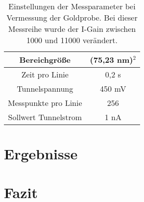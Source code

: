 \documentclass[12pt,a4paper]{article}
\begin{document}
\begin{table}
\centering
\begin{tabular}{|c|c|}
\hline 
Bereichgröße & (75,23 nm)$^2$ \\ 
\hline 
Zeit pro Linie & 0,2 s \\
\hline 
Tunnelspannung & 450 mV \\ 
\hline 
Messpunkte pro Linie & 256 \\
\hline 
Sollwert Tunnelstrom & 1 nA \\
\hline 
\end{tabular} 
\caption{Einstellungen der Messparameter bei Vermessung der Goldprobe. Bei dieser Messreihe wurde der I-Gain zwischen 1000 und 11000 verändert.}
\label{tab:IGain_Einstellungen}
\end{table}


\section{Ergebnisse}

\section{Fazit}
\end{document}

